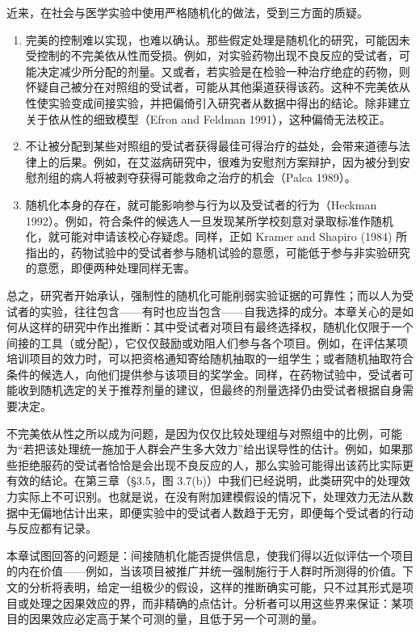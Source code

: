 近来，在社会与医学实验中使用严格随机化的做法，受到三方面的质疑。

\begin{enumerate}[label=\arabic*.,leftmargin=2.0em]
\item 完美的控制难以实现，也难以确认。那些假定处理是随机化的研究，可能因未受控制的不完美依从性而受损。例如，对实验药物出现不良反应的受试者，可能决定减少所分配的剂量。又或者，若实验是在检验一种治疗绝症的药物，则怀疑自己被分在对照组的受试者，可能从其他渠道获得该药。这种不完美依从性使实验变成间接实验，并把偏倚引入研究者从数据中得出的结论。除非建立关于依从性的细致模型（Efron and Feldman 1991），这种偏倚无法校正。

\item 不让被分配到某些对照组的受试者获得最佳可得治疗的益处，会带来道德与法律上的后果。例如，在艾滋病研究中，很难为安慰剂方案辩护，因为被分到安慰剂组的病人将被剥夺获得可能救命之治疗的机会（Palca 1989）。

\item 随机化本身的存在，就可能影响参与行为以及受试者的行为（Heckman 1992）。例如，符合条件的候选人一旦发现某所学校刻意对录取标准作随机化，就可能对申请该校心存疑虑。同样，正如 Kramer and Shapiro (1984) 所指出的，药物试验中的受试者参与随机试验的意愿，可能低于参与非实验研究的意愿，即便两种处理同样无害。
\end{enumerate}

总之，研究者开始承认，强制性的随机化可能削弱实验证据的可靠性；而以人为受试者的实验，往往包含——有时也应当包含——自我选择的成分。本章关心的是如何从这样的研究中作出推断：其中受试者对项目有最终选择权，随机化仅限于一个间接的工具（或分配），它仅仅鼓励或劝阻人们参与各个项目。例如，在评估某项培训项目的效力时，可以把资格通知寄给随机抽取的一组学生；或者随机抽取符合条件的候选人，向他们提供参与该项目的奖学金。同样，在药物试验中，受试者可能收到随机选定的关于推荐剂量的建议，但最终的剂量选择仍由受试者根据自身需要决定。

不完美依从性之所以成为问题，是因为仅仅比较处理组与对照组中的比例，可能为“若把该处理统一施加于人群会产生多大效力”给出误导性的估计。例如，如果那些拒绝服药的受试者恰恰是会出现不良反应的人，那么实验可能得出该药比实际更有效的结论。在第三章（\S 3.5，图 3.7(b)）中我们已经说明，此类研究中的处理效力实际上不可识别。也就是说，在没有附加建模假设的情况下，处理效力无法从数据中无偏地估计出来，即便实验中的受试者人数趋于无穷，即便每个受试者的行动与反应都有记录。

本章试图回答的问题是：间接随机化能否提供信息，使我们得以近似评估一个项目的内在价值——例如，当该项目被推广并统一强制施行于人群时所测得的价值。下文的分析将表明，给定一组极少的假设，这样的推断确实可能，只不过其形式是项目或处理之因果效应的界，而非精确的点估计。分析者可以用这些界来保证：某项目的因果效应必定高于某个可测的量，且低于另一个可测的量。

